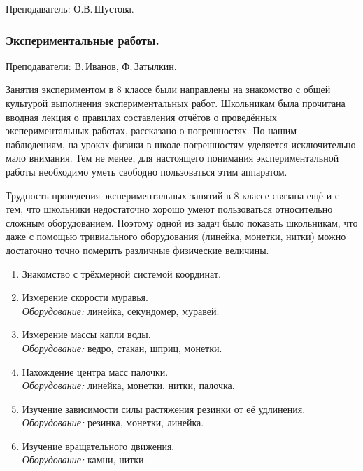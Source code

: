 \documentclass[12pt,a4paper,oneside,draft]{scrartcl}
\newcounter{notask}
\newlength{\h}
\newlength{\x}
\begin{document}
\textsf{Преподаватель: О.В.\,Шустова.}
\smallskip
\parindent=0mm






\setcounter{notask}{1}
\parindent=5mm

\subsubsection{Экспериментальные работы.}
\label{sec:daily_8_exp}

\textsf{Преподаватели: В.\,Иванов, Ф.\,Затылкин.}

Занятия экспериментом в 8 классе были направлены на знакомство с общей
культурой выполнения экспериментальных работ. Школьникам была
прочитана вводная лекция о правилах составления отчётов о проведённых
экспериментальных работах, рассказано о погрешностях. По нашим
наблюдениям, на уроках физики в школе погрешностям уделяется
исключительно мало внимания. Тем не менее, для настоящего понимания
экспериментальной работы необходимо уметь свободно пользоваться этим
аппаратом.

Трудность проведения экспериментальных занятий в 8 классе связана ещё
и с тем, что школьники недостаточно хорошо умеют пользоваться
относительно сложным оборудованием. Поэтому одной из задач было
показать школьникам, что даже с помощью тривиального оборудования
(линейка, монетки, нитки) можно достаточно точно померить различные
физические величины. 

\begin{enumerate}
\item Знакомство с трёхмерной системой координат. 
\item Измерение скорости муравья.  \\ \textit{Оборудование:} линейка,
  секундомер, муравей.
\item Измерение массы капли воды. \\ \textit{Оборудование:} ведро,
  стакан, шприц, монетки.
\item Нахождение центра масс палочки. \\ \textit{Оборудование:}
  линейка, монетки, нитки, палочка.
\item Изучение зависимости силы растяжения резинки от её удлинения. \\
  \textit{Оборудование:} резинка, монетки, линейка.
\item Изучение вращательного движения. \\ \textit{Оборудование:}
  камни, нитки. 
\end{enumerate}
\end{document}
